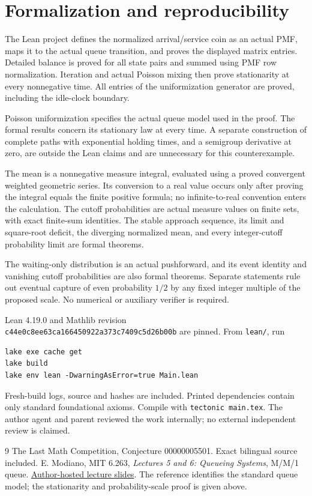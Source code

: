 \documentclass[11pt]{article}
\begin{document}
\newpage
\section*{Formalization and reproducibility}
The Lean project defines the normalized arrival/service
coin as an actual PMF, maps it to the actual queue
transition, and proves the displayed matrix entries.
Detailed balance is proved for all state pairs and
summed using PMF row normalization. Iteration and actual
Poisson mixing then prove stationarity at every
nonnegative time. All entries of the uniformization
generator are proved, including the idle-clock boundary.

Poisson uniformization specifies the actual queue model
used in the proof. The formal results concern its
stationary law at every time. A separate construction
of complete paths with exponential holding times, and
a semigroup derivative at zero, are outside the Lean
claims and are unnecessary for this counterexample.

The mean is a nonnegative measure integral, evaluated
using a proved convergent weighted geometric series.
Its conversion to a real value occurs only after proving
the integral equals the finite positive formula; no
infinite-to-real convention enters the calculation.
The cutoff probabilities are actual measure values
on finite sets, with exact finite-sum identities.
The stable approach sequence, its limit and square-root
deficit, the diverging normalized mean, and every
integer-cutoff probability limit are formal theorems.

The waiting-only distribution is an actual pushforward,
and its event identity and vanishing cutoff probabilities
are also formal theorems. Separate statements rule out
eventual capture of even probability $1/2$ by any fixed
integer multiple of the proposed scale. No numerical
or auxiliary verifier is required.

Lean 4.19.0 and Mathlib revision\\
\texttt{c44e0c8ee63ca166450922a373c7409c5d26b00b}
are pinned. From \texttt{lean/}, run
\begin{verbatim}
lake exe cache get
lake build
lake env lean -DwarningAsError=true Main.lean
\end{verbatim}
Fresh-build logs, source and hashes are included.
Printed dependencies contain only standard foundational
axioms. Compile with \texttt{tectonic main.tex}.
The author agent and parent reviewed the work internally;
no external independent review is claimed.

\begin{thebibliography}{9}
 The Last Math Competition,
Conjecture 00000005501. Exact bilingual source included.
 E. Modiano, MIT 6.263,
\emph{Lectures 5 and 6: Queueing Systems}, M/M/1 queue.
\href{https://web.mit.edu/modiano/www/6.263/lec5-6.pdf}{Author-hosted lecture slides}.
The reference identifies the standard queue model;
the stationarity and probability-scale proof is given above.
\end{thebibliography}
\end{document}
